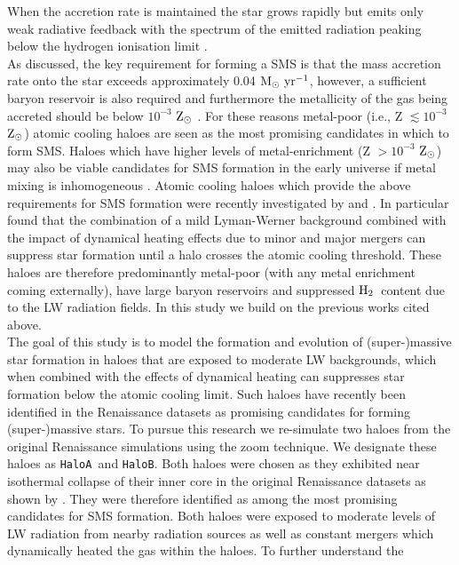 \documentclass[graphics, twocolumn, usenatbib]{mn2e}
\newcommand{\msolaryrc} {$\rm{M_{\odot}~yr^{-1}}$}
\newcommand{\zsolar} {$\rm{Z_{\odot}}~$}
\newcommand{\zsolarc} {$\rm{Z_{\odot}}$}
\newcommand{\molH} {$\rm{H_2}$~}
\newcommand{\ha} {\texttt{HaloA~}}
\newcommand{\hbc} {\texttt{HaloB}}
\begin{document}
When the accretion rate is maintained the star grows rapidly but emits
only weak radiative feedback with the spectrum of the emitted radiation peaking below
the hydrogen ionisation limit \citep{Woods_2018}. \\
\indent As discussed, the key requirement for
forming a SMS is that the mass accretion rate onto the star exceeds approximately 0.04 \msolaryrc,
however, a sufficient baryon reservoir is also required and furthermore the metallicity of the gas
being accreted should be below $10^{-3}$ \zsolar \citep{Chon_2020}. For these reasons
metal-poor (i.e., Z $\lesssim 10^{-3}$ \zsolarc) atomic cooling haloes are seen as the most 
promising candidates in which to form SMS. Haloes which have higher levels of 
metal-enrichment (Z $> 10^{-3}$ \zsolarc) may also be viable candidates for 
SMS formation in the early universe if metal mixing is inhomogeneous \citep{Regan_2020a}. Atomic cooling
haloes which provide the above requirements for SMS formation were recently investigated by \cite{Wise_2019}
and \cite{Regan_2020}. In particular \cite{Wise_2019} found that the combination 
of a mild Lyman-Werner background combined with the impact of dynamical heating effects due to
minor and major mergers can suppress star formation until a halo crosses the atomic cooling threshold.
These haloes are therefore predominantly metal-poor (with any metal enrichment coming externally), have large 
baryon reservoirs and suppressed \molH content due to the LW radiation fields. 
In this study we build on the previous works cited above. \\
\indent The goal of this study is to model the formation and evolution of (super-)massive star
  formation in haloes that are exposed to moderate LW backgrounds, which when combined with the effects
  of dynamical heating can suppresses star formation below the atomic cooling limit.
  Such haloes have recently been identified in the Renaissance datasets \citep{Wise_2019, Regan_2020}
  as promising candidates for forming (super-)massive stars.  To pursue this research we re-simulate
  two haloes from the original Renaissance simulations using the zoom technique.
  We designate
  these haloes as \ha and \hbc. Both haloes were chosen as they exhibited near isothermal
  collapse of their inner core in the original Renaissance datasets as shown by \cite{Regan_2020}.
  They were therefore identified as among the most promising candidates for SMS formation. Both
  haloes were exposed to moderate levels of LW radiation from nearby radiation sources as well as
  constant mergers which dynamically heated the gas within the haloes. To further understand the
\end{document}
